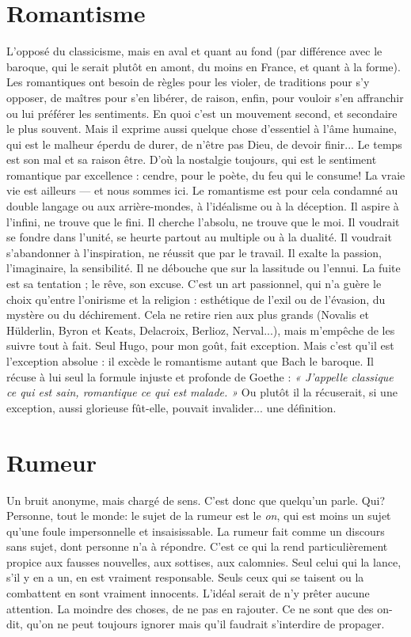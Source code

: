 \section{Romantisme}
L’opposé du classicisme, mais en aval et quant au fond (par
différence avec le baroque, qui le serait plutôt en amont,
du moins en France, et quant à la forme). Les romantiques ont besoin de règles
pour les violer, de traditions pour s’y opposer, de maîtres pour s’en libérer, de
raison, enfin, pour vouloir s’en affranchir ou lui préférer les sentiments. En
quoi c’est un mouvement second, et secondaire le plus souvent. Mais il exprime
aussi quelque chose d’essentiel à l’âme humaine, qui est le malheur éperdu de
durer, de n’être pas Dieu, de devoir finir... Le temps est son mal et sa raison
être. D’où la nostalgie toujours, qui est le sentiment romantique par
excellence : cendre, pour le poète, du feu qui le consume! La vraie vie est
ailleurs — et nous sommes ici. Le romantisme est pour cela condamné au
double langage ou aux arrière-mondes, à l’idéalisme ou à la déception. Il aspire
à l'infini, ne trouve que le fini. Il cherche l'absolu, ne trouve que le moi. Il voudrait
se fondre dans l’unité, se heurte partout au multiple ou à la dualité. Il
voudrait s’abandonner à l'inspiration, ne réussit que par le travail. Il exalte la
passion, l’imaginaire, la sensibilité. Il ne débouche que sur la lassitude ou
l'ennui. La fuite est sa tentation ; le rêve, son excuse. C’est un art passionnel,
qui n’a guère le choix qu’entre l’onirisme et la religion : esthétique de l'exil ou
de l'évasion, du mystère ou du déchirement. Cela ne retire rien aux plus grands
(Novalis et Hülderlin, Byron et Keats, Delacroix, Berlioz, Nerval...), mais
m’empêche de les suivre tout à fait. Seul Hugo, pour mon goût, fait exception.
Mais c’est qu’il est l’exception absolue : il excède le romantisme autant que
Bach le baroque. Il récuse à lui seul la formule injuste et profonde de Goethe :
{\it « J'appelle classique ce qui est sain, romantique ce qui est malade. »} Ou plutôt il la
récuserait, si une exception, aussi glorieuse fût-elle, pouvait invalider... une
définition.

\section{Rumeur}
Un bruit anonyme, mais chargé de sens. C’est donc que quelqu’un
parle. Qui? Personne, tout le monde: le sujet de la
rumeur est le {\it on}, qui est moins un sujet qu’une foule impersonnelle et insaisissable.
La rumeur fait comme un discours sans sujet, dont personne n’a à
répondre. C’est ce qui la rend particulièrement propice aux fausses nouvelles,
aux sottises, aux calomnies. Seul celui qui la lance, s’il y en a un, en est vraiment
responsable. Seuls ceux qui se taisent ou la combattent en sont vraiment
innocents. L'idéal serait de n’y prêter aucune attention. La moindre des choses,
de ne pas en rajouter. Ce ne sont que des on-dit, qu’on ne peut toujours
ignorer mais qu’il faudrait s’interdire de propager.
%

